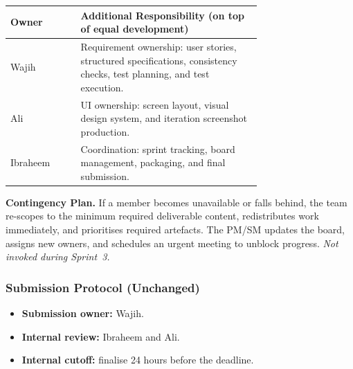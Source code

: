 \documentclass[11pt, legalpaper]{article}
\begin{document}
\medskip
\noindent\begin{tabular}{l p{0.72\linewidth}}
  \toprule
  \textbf{Owner} & \textbf{Additional Responsibility (on top of equal development)} \\
  \midrule
  Wajih    & Requirement ownership: user stories, structured specifications, consistency checks, test planning, and test execution. \\[2pt]
  Ali      & UI ownership: screen layout, visual design system, and iteration screenshot production. \\[2pt]
  Ibraheem & Coordination: sprint tracking, board management, packaging, and final submission. \\
  \bottomrule
\end{tabular}

\medskip
\noindent\textbf{Contingency Plan.}
If a member becomes unavailable or falls behind, the team re-scopes to the
minimum required deliverable content, redistributes work immediately, and
prioritises required artefacts. The PM/SM updates the board, assigns new
owners, and schedules an urgent meeting to unblock progress.
\textit{Not invoked during Sprint~3.}

\subsubsection*{Submission Protocol (Unchanged)}
\begin{itemize}
  \item \textbf{Submission owner:} Wajih.
  \item \textbf{Internal review:} Ibraheem and Ali.
  \item \textbf{Internal cutoff:} finalise 24 hours before the deadline.
\end{itemize}
\end{document}
